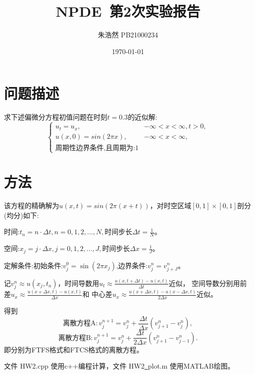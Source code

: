 \documentclass{article}
\title{NPDE~第2次实验报告}
\author{朱浩然 PB21000234}
\date{\today}
\begin{document}
\maketitle

\section{问题描述}
求下述偏微分方程初值问题在时刻$t=0.3$的近似解:
$$\left\{\begin{array}{ll}
    u_t=u_x,&-\infty<x<\infty,t>0,\\
    u(x,0)=sin(2\pi x),&-\infty<x<\infty,\\
    \text{周期性边界条件,且周期为:}1
\end{array}\right.$$

\section{方法}
该方程的精确解为$u(x,t)=sin(2\pi(x+t))$，对时空区域$[0,1]\times[0,1]$剖分(均分)如下:\par
时间:$t_{n}=n\cdot\Delta t, n=0,1,2,...,N,$时间步长$\Delta t=\frac{1}{N}$。\par
空间:$x_{j}=j\cdot\Delta x, j=0,1,2,...,J,$时间步长$\Delta x=\frac{1}{J}$。\par
定解条件:初始条件:$v_{j}^{0}=\sin(2\pi x_{j})$,边界条件:$v_{j}^{n}=v_{j+J}^{n}$。\par
记$v^n_j\approx u(x_{j},t_{n})$，时间导数用$u_{t} \approx \frac{u(x,t+\Delta t)-u(x,t)}{\Delta t}$近似，
空间导数分别用前差$u_{x} \approx \frac{u(x+\Delta x,t)-u(x,t)}{\Delta x}$和
中心差$u_{x} \approx \frac{u(x+\Delta x,t)-u(x-\Delta x,t)}{2\Delta x}$近似。\par
得到
$$\text{离散方程A}:v_j^{n+1}=v_j^n+\frac{\Delta t}{\Delta x}(v_{j+1}^n-v_j^n),$$
$$\text{离散方程B}:v_j^{n+1}=v_j^n+\frac{\Delta t}{2\Delta x}(v_{j+1}^n-v_{j-1}^n).$$
即分别为FTFS格式和FTCS格式的离散方程。\par
文件 HW2.cpp 使用c++编程计算，文件 HW2\underline{~}plot.m 使用MATLAB绘图。

\newpage
\end{document}
